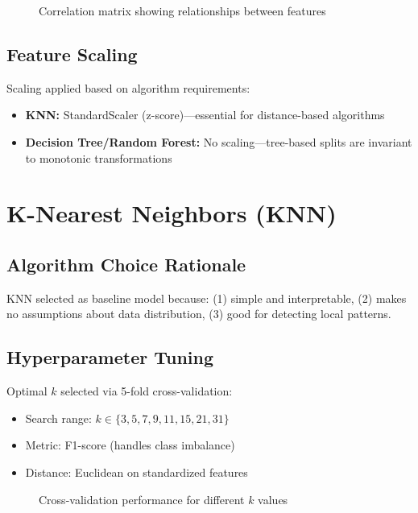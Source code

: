 \begin{figure}[H]
    \centering
    \caption{Correlation matrix showing relationships between features}
    \label{fig:feature_correlation}
\end{figure}

\subsection*{Feature Scaling}
Scaling applied based on algorithm requirements:
\begin{itemize}
    \item \textbf{KNN:} StandardScaler (z-score)---essential for distance-based algorithms
    \item \textbf{Decision Tree/Random Forest:} No scaling---tree-based splits are invariant to monotonic transformations
\end{itemize}

\section{K-Nearest Neighbors (KNN)}

\subsection*{Algorithm Choice Rationale}
KNN selected as baseline model because: (1) simple and interpretable, (2) makes no assumptions about data distribution, (3) good for detecting local patterns.

\subsection*{Hyperparameter Tuning}
Optimal $k$ selected via 5-fold cross-validation:
\begin{itemize}
    \item Search range: $k \in \{3, 5, 7, 9, 11, 15, 21, 31\}$
    \item Metric: F1-score (handles class imbalance)
    \item Distance: Euclidean on standardized features
\end{itemize}

\begin{figure}[H]
    \centering
    \caption{Cross-validation performance for different $k$ values}
    \label{fig:knn_cv}
\end{figure}

